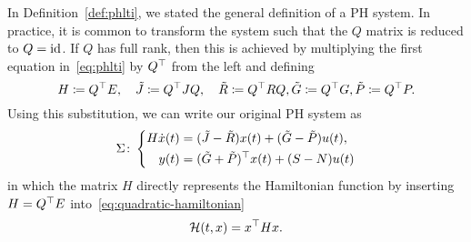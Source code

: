 \begin{remark}
    In Definition~\ref{def:phlti}, we stated the general definition of a \ac{PH} system.
    In practice, it is common to transform the system such that the $Q$ matrix is reduced to $Q = \text{id}_{}$.
    If $Q$ has full rank, then this is achieved by multiplying the first equation in~\eqref{eq:phlti} by $Q^{\top}$ from the left and defining
    \begin{equation*}
        H \coloneqq Q^{\top} E,\quad \tilde{J} \coloneqq Q^{\top} J Q,\quad \tilde{R} \coloneqq Q^{\top} R Q, \tilde{G} \coloneqq Q^{\top} G, \tilde{P} \coloneqq Q^{\top} P.
    \end{equation*}
    Using this substitution, we can write our original \ac{PH} system as
    \begin{equation*}
        \Sigma \colon \left\lbrace
        \begin{aligned}
            H \dot{x}(t) &= (\tilde{J} - \tilde{R}) x(t) + (\tilde{G} - \tilde{P}) u(t), \\
            y(t) &= (\tilde{G} + \tilde{P})^{\top} x(t) + (S - N) u(t)
        \end{aligned}
        \right.
    \end{equation*}
    in which the matrix $H$ directly represents the Hamiltonian function by inserting $H = Q^{\top} E$ into~\eqref{eq:quadratic-hamiltonian}
    \begin{equation*}
        \mathcal{H}(t, x) = x^{\top} H x.
    \end{equation*}
\end{remark}


